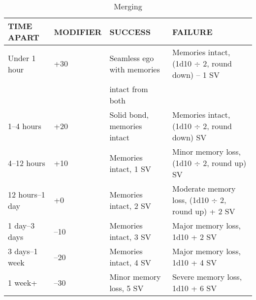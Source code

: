 \begin{table} \caption{Merging} \begin{tabular}{|l|l|l|l|} \hline

TIME APART &MODIFIER &SUCCESS &FAILURE \\ \hline

Under 1 hour &+30 &Seamless ego with memories &Memories intact, (1d10 $\div$ 2, round down) – 1 SV \\ &&intact from both &\\ \hline

1–4 hours &+20 &Solid bond, memories intact &Memories intact, (1d10 $\div$ 2, round down) SV \\ \hline

4–12 hours &+10 &Memories intact, 1 SV &Minor memory loss, (1d10 $\div$ 2, round up) SV \\ \hline

12 hours–1 day &+0 &Memories intact, 2 SV &Moderate memory loss, (1d10 $\div$ 2, round up) + 2 SV \\ \hline

1 day–3 days &–10 &Memories intact, 3 SV &Major memory loss, 1d10 + 2 SV \\ \hline

3 days–1 week &–20 &Memories intact, 4 SV &Major memory loss, 1d10 + 4 SV \\ \hline

1 week+ &–30 &Minor memory loss, 5 SV &Severe memory loss, 1d10 + 6 SV \\ \hline

\end{tabular} \label{table:merging} \end{table} 

